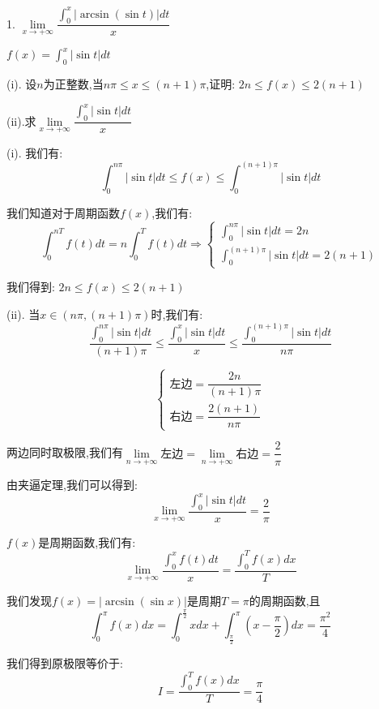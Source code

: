 1. $\lim\limits_{x\rightarrow+\infty}\dfrac{\int_{0}^{x}|\arcsin(\sin t)|dt}{x}$
\begin{lemma}[周期函数积分性质]\label{lem: 周期函数积分性质}
	$f(x)=\int_{0}^{x}|\sin t|dt$
	
	(i). 设$n$为正整数,当$n\pi\leq x\leq (n+1)\pi$,证明: $2n\leq f(x)\leq 2(n+1)$
	
	(ii).求$\lim\limits_{x\rightarrow+\infty}\dfrac{\int_{0}^{x}|\sin t|dt}{x}$
	\begin{solution}
		
		(i). 我们有: 
		$$\int_{0}^{n\pi}|\sin t|dt\leq f(x)\leq \int_{0}^{(n+1)\pi}|\sin t|dt$$
		
		我们知道对于周期函数$f(x)$,我们有: 
		$$\int_{0}^{nT}f(t)dt=n\int_{0}^{T}f(t)dt\Rightarrow \left\lbrace 
		\begin{array}{l}
			\int_{0}^{n\pi}|\sin t|dt=2n\\
			\int_{0}^{(n+1)\pi}|\sin t|dt=2(n+1)
		\end{array}
		\right. $$
		
		我们得到: $2n\leq f(x)\leq 2(n+1)$
		
		(ii). 当$x\in(n\pi,(n+1)\pi)$时,我们有: 
		$$\dfrac{\int_{0}^{n\pi}|\sin t|dt}{(n+1)\pi}\leq \dfrac{\int_{0}^{x}|\sin t|dt}{x}\leq \dfrac{\int_{0}^{(n+1)\pi}|\sin t|dt}{n\pi}$$
		
		$$\left\lbrace 
		\begin{array}{l}
			\text{左边}=\dfrac{2n}{(n+1)\pi}\\
			\text{右边}=\dfrac{2(n+1)}{n\pi}
		\end{array}
		\right. $$
		
		两边同时取极限,我们有$\lim\limits_{n\rightarrow+\infty}\text{左边}=\lim\limits_{n\rightarrow+\infty}\text{右边}=\dfrac{2}{\pi}$
		
		由夹逼定理,我们可以得到: 
		$$\lim\limits_{x\rightarrow+\infty}\dfrac{\int_{0}^{x}|\sin t|dt}{x}=\dfrac{2}{\pi}$$
	\end{solution}
\end{lemma}
\begin{theorem}[周期函数性质]
	$f(x)$是周期函数,我们有: 
	$$\lim\limits_{x\rightarrow+\infty}\dfrac{\int_{0}^{x}f(t)dt}{x}=\dfrac{\int_{0}^{T}f(x)dx}{T}$$
\end{theorem}
\begin{solution}
	
	我们发现$f(x)=|\arcsin (\sin x)|$是周期$T=\pi$的周期函数,且$$\int_{0}^{\pi}f(x)dx=\int_{0}^{\frac{\pi}{2}}xdx+\int_{\frac{\pi}{2}}^{\pi}(x-\dfrac{\pi}{2})dx=\dfrac{\pi^2}{4}$$
	
	我们得到原极限等价于: 
	$$I=\dfrac{\int_{0}^{T}f(x)dx}{T}=\dfrac{\pi}{4}$$
\end{solution}


